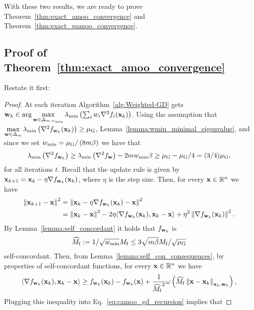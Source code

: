 With these two results, we are ready to prove Theorem~\ref{thm:exact_amoo_convergence} and Theorem~\ref{thm:exact_pamoo_convergence}.\\
\subsection{Proof of Theorem~\ref{thm:exact_amoo_convergence}}
Restate it first:
\ExactAmooConvergence*

\begin{proof}
At each iteration Algorithm~\ref{alg:Weighted-GD} gets ${\mathbf{w}}_k \in\arg\max\limits_{{\mathbf{w}}\in \Delta_{m,w_{\min}}} \lambda_{\min} \left(\sum_{i} w_i \nabla^2 f_i({\mathbf{x}}_{k})\right)$. Using the assumption that $\max\limits_{{\mathbf{w}}\in \Delta_m}\lambda_{\min}\left(\nabla^2 f_{{\mathbf{w}}_k}({\mathbf{x}}_k)\right) \geq {\mu_{\mathrm{G}}}$, Lemma~\ref{lemma:wmin_minimal_eigenvalue}, and since we set $w_{\min}={\mu_{\mathrm{G}}}/\left(8m\beta\right)$ we have that
\begin{align}
    \lambda_{\min} \left(\nabla^2f_{{\mathbf{w}}_k}\right)\geq \lambda_{\min}\left(\nabla^2f_{{\mathbf{w}}}\right) - 2m{w_{\min}}\beta \geq {\mu_{\mathrm{G}}} - {\mu_{\mathrm{G}}}/4 = (3/4){\mu_{\mathrm{G}}} , \label{eq:strongly_convex_param_of_AMOOO}
\end{align}
for all iterations $t$.
Recall that the update rule is given by ${\mathbf{x}}_{k+1} = {\mathbf{x}}_k - \eta\nabla f_{{\mathbf{w}}_k}({\mathbf{x}}_k)$, where $\eta$ is the step size.
Then, for every ${\mathbf{x}} \in \mathbb{R}^n$ we have
\begin{align}
    \left\Vert{\mathbf{x}}_{k+1}-{\mathbf{x}}\right\Vert^2 &= \left\Vert{\mathbf{x}}_k-\eta\nabla f_{{\mathbf{w}}_k}({\mathbf{x}}_k)-{\mathbf{x}}\right\Vert^2 \nonumber \\
    &=\left\Vert{\mathbf{x}}_k-{\mathbf{x}}\right\Vert^2 - 2\eta\langle \nabla f_{{\mathbf{w}}_k}({\mathbf{x}}_k), {\mathbf{x}}_k - {\mathbf{x}} \rangle + \eta^2\left\Vert\nabla f_{{\mathbf{w}}_k}({\mathbf{x}}_k)\right\Vert^2 \label{eq:camoo_gd_recursion}.
\end{align}
By Lemma~\ref{lemma:self_concordant} it holds that $f_{{\mathbf{w}}_k}$ is 
\begin{align}
    \widehat{M_{\mathrm{f}}} :=1/\sqrt{{w_{\min}}} M_{\mathrm{f}}\leq 3\sqrt{m\beta}M_{\mathrm{f}}/\sqrt{{\mu_{\mathrm{G}}}}\label{eq:self_concordant_param_of_sum}
\end{align}
self-concordant. Then, from Lemma~\ref{lemma:self_con_consequences}, by properties of self-concordant functions, for every ${\mathbf{x}} \in \mathbb{R}^n$ we have
\begin{align*}
      \langle \nabla f_{{\mathbf{w}}_k}({\mathbf{x}}_k), {\mathbf{x}}_k-{\mathbf{x}}  \rangle \geq f_{{\mathbf{w}}_k}({\mathbf{x}}_k) -f_{{\mathbf{w}}_k}({\mathbf{x}}) + \frac{1}{\widehat{M_{\mathrm{f}}}^2} \omega\left(\widehat{M_{\mathrm{f}}}\left\Vert{\mathbf{x}} - {\mathbf{x}}_k\right\Vert_{{\mathbf{x}}_k,{\mathbf{w}}_k} \right),
\end{align*}
Plugging this inequality into Eq.~\eqref{eq:camoo_gd_recursion} implies that

\end{proof}
